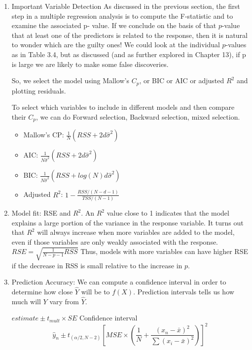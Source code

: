 \begin{description}
\begin{enumerate}
\item Important Variable Detection
As discussed in the previous section, the first step in a 
multiple regression analysis is to compute the F-statistic 
and to examine the associated p- value. If we conclude on 
the basis of that $p$-value that at least one of the predictors is 
related to the response, then it is natural to wonder which are 
the guilty ones! We could look at the individual $p$-values 
as in Table 3.4, but as discussed (and as further explored in Chapter 13), 
if p is large we are likely to make some false discoveries.

So, we select the model using Mallow's $C_p$, or BIC or AIC or
adjusted $R^2$ and plotting residuals.

To select which variables to include in different models and then
compare their $C_p$, we can do Forward selection, Backward selection,
mixed selection.
\begin{itemize}
\item Mallow's CP: $\frac{1}{N} (RSS + 2d \hat \sigma^2)$
\item  AIC: $\frac{1}{N\hat \sigma^2}(RSS + 2d \hat \sigma^2)$
\item  BIC: $\frac{1}{N\hat \sigma^2}(RSS + log(N) d \hat \sigma^2)$
\item  Adjusted $R^2$: $1 - \frac{RSS/(N-d-1)}{TSS/(N-1)}$
\end{itemize}

\item Model fit: RSE and $R^2$. An $R^2$ value close to 1 
indicates that the model explains a large portion of the 
variance in the response variable.
It turns out that  $R^2$ will always increase when more 
variables are added to the model, even if those variables are 
only weakly associated with the response.
$RSE = \sqrt{\frac{1}{N-p-1}RSS}$ Thus, models with more 
variables can have higher RSE if the decrease in RSS is small 
relative to the increase in $p$.

\item Prediction Accuracy:
We can compute a confidence interval in order to determine how close $\hat Y$ 
will be to $f(X)$. Prediction intervals tells us 
how much will $Y$ vary from $\hat Y$.

$estimate \pm  t_{mult} \times SE$
Confidence interval 
\begin{equation}\label{eq:COnfInterval}
\hat y_n \pm t_{(\alpha/2, N-2)} \left[  MSE \times \left(  \frac{1}{N} + \frac{(x_n - \bar x)^2}{\sum(x_i - \bar x)^2}\right)      \right]^2
\end{equation}


\end{enumerate}
\end{description}
